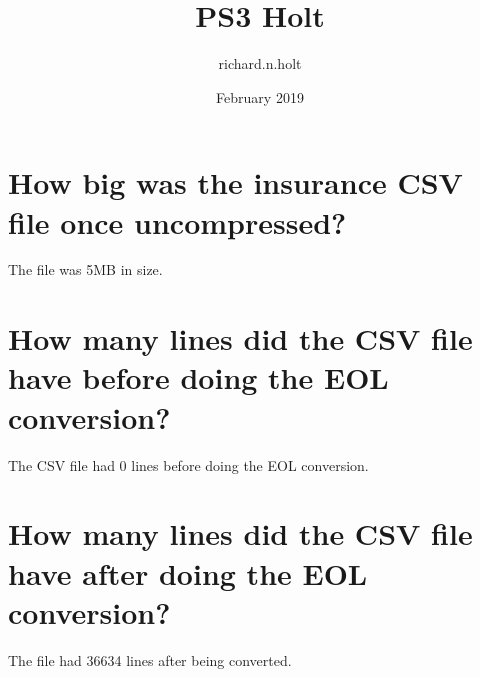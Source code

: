 \documentclass{article}
\title{PS3 Holt}
\author{richard.n.holt }
\date{February 2019}
\begin{document}
\maketitle

\section{How big was the insurance CSV file once uncompressed?}
The file was 5MB in size.

\section{How many lines did the CSV file have before doing the EOL conversion?}
The CSV file had 0 lines before doing the EOL conversion.

\section{How many lines did the CSV file have after doing the EOL conversion?}
The file had 36634 lines after being converted.
\end{document}
